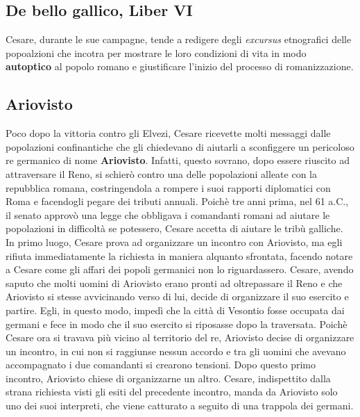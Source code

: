 \documentclass[10pt,a4paper]{article}
\begin{document}
	\subsection{De bello gallico, Liber VI}

	Cesare, durante le sue campagne, tende a redigere degli \textit{excursus} etnografici delle popoalzioni che incotra per mostrare le loro condizioni di vita in modo \textbf{autoptico} al popolo romano e giustificare l'inizio del processo di romanizzazione.

\subsection{Ariovisto}

	Poco dopo la vittoria contro gli Elvezi, Cesare ricevette molti messaggi dalle popolazioni confinantiche che gli chiedevano di aiutarli a sconfiggere un pericoloso re germanico di nome \textbf{Ariovisto}. Infatti, questo sovrano, dopo essere riuscito ad attraversare il Reno, si schierò contro una delle popolazioni alleate con la repubblica romana, costringendola a rompere i suoi rapporti diplomatici con Roma e facendogli pegare dei tributi annuali. Poichè tre anni prima, nel 61 a.C., il senato approvò una legge che obbligava i comandanti romani ad aiutare le popolazioni in difficoltà se potessero, Cesare accetta di aiutare le tribù galliche. In primo luogo, Cesare prova ad organizzare un incontro con Ariovisto, ma egli rifiuta immediatamente la richiesta in maniera alquanto sfrontata, facendo notare a Cesare come gli affari dei popoli germanici non lo riguardassero. Cesare, avendo saputo che molti uomini di Ariovisto erano pronti ad oltrepassare il Reno e che Ariovisto si stesse avvicinando verso di lui, decide di organizzare il suo esercito e partire. Egli, in questo modo, impedì che la città di Vesontio fosse occupata dai germani e fece in modo che il suo esercito si riposasse dopo la traversata. Poichè Cesare ora si travava più vicino al territorio del re, Ariovisto decise di organizzare un incontro, in cui non si raggiunse nessun accordo e tra gli uomini che avevano accompagnato i due comandanti si crearono tensioni. Dopo questo primo incontro, Ariovisto chiese di organizzarne un altro. Cesare, indispettito dalla strana richiesta visti gli esiti del precedente incontro, manda da Ariovisto solo uno dei suoi interpreti, che viene catturato a seguito di una trappola dei germani.
\end{document}
